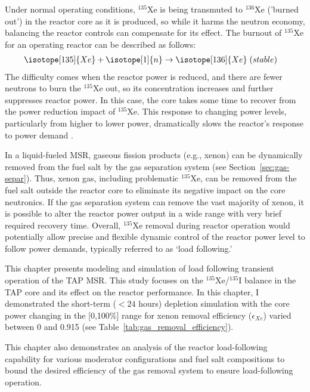 Under normal operating conditions, $^{135}$Xe is being 
transmuted to $^{136}$Xe ('burned out') in the reactor core as it is produced, 
so while it harms the neutron economy, balancing the reactor controls can 
compensate for its effect. The burnout of $^{135}$Xe for an operating reactor 
can be described as follows:
\begin{align}
& \isotope[135]{Xe}+\isotope[1]{n}\rightarrow \isotope[136]{Xe} \;(stable)
\end{align}
The difficulty comes when the reactor power is reduced, and there are fewer 
neutrons to burn the $^{135}$Xe out, so its concentration increases and 
further suppresses reactor power. In this case, the core takes some time to 
recover from the power reduction impact of $^{135}$Xe. This response to 
changing power levels, particularly from higher to lower power, 
dramatically slows the reactor's response to power demand
\cite{lokhov_load-following_2011}. 

In a liquid-fueled \gls{MSR}, gaseous fission products (e.g., xenon) can be 
dynamically removed from the fuel salt by the gas separation system (see 
Section~\ref{sec:gas-separ}). Thus, xenon gas, including problematic 
$^{135}$Xe, can be removed from the fuel salt outside the reactor core to 
eliminate its negative impact on the core neutronics. If the gas separation 
system can remove the vast majority of xenon, it is possible to alter the 
reactor power output in a wide range with very brief required recovery time. 
Overall, $^{135}$Xe removal during reactor operation would potentially allow 
precise and flexible dynamic control of the reactor power level to follow 
power demands, typically referred to as `load following.'

This chapter presents modeling and simulation of load following transient 
operation of the \gls{TAP} \gls{MSR}. This study focuses on the 
$^{135}$Xe/$^{135}$I balance in the \gls{TAP} core and its effect on the 
reactor performance. In this chapter, I demonstrated the short-term ($<24$ 
hours) depletion simulation with the core power changing in the [0,100\%] 
range for xenon removal efficiency ($\epsilon_{Xe}$) varied between 0 and 
0.915 (see Table~\ref{tab:gas_removal_efficiency}). 

This chapter also demonstrates an analysis of the reactor load-following 
capability for various moderator configurations and fuel salt compositions to 
bound the desired efficiency of the gas removal system to ensure 
load-following operation. 

